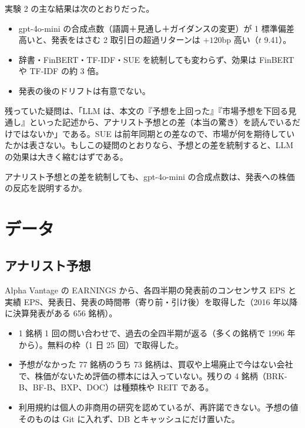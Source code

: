 \documentclass[xelatex,ja=standard,jafont=haranoaji,a4paper,10pt,openany]{bxjsreport}
\begin{document}
実験 2 の主な結果は次のとおりだった。

\begin{itemize}
\item gpt-4o-mini の合成点数（語調＋見通し＋ガイダンスの変更）が 1 標準偏差高いと、発表をはさむ 2 取引日の超過リターンは $+120$bp 高い（$t$ 9.41）。
\item 辞書・FinBERT・TF-IDF・SUE を統制しても変わらず、効果は FinBERT や TF-IDF の約 3 倍。
\item 発表の後のドリフトは有意でない。
\end{itemize}

残っていた疑問は、「LLM は、本文の『予想を上回った』『市場予想を下回る見通し』といった記述から、アナリスト予想との差（本当の驚き）を読んでいるだけではないか」である。SUE は前年同期との差なので、市場が何を期待していたかは表さない。もしこの疑問のとおりなら、予想との差を統制すると、LLM の効果は大きく縮むはずである。

\begin{verdict}[問い]
アナリスト予想との差を統制しても、gpt-4o-mini の合成点数は、発表への株価の反応を説明するか。
\end{verdict}

\chapter{データ}\label{ch:data}

\section{アナリスト予想}

Alpha Vantage の EARNINGS から、各四半期の発表前のコンセンサス EPS と実績 EPS、発表日、発表の時間帯（寄り前・引け後）を取得した（2016 年以降に決算発表がある 656 銘柄）。

\begin{itemize}
\item 1 銘柄 1 回の問い合わせで、過去の全四半期が返る（多くの銘柄で 1996 年から）。無料の枠（1 日 25 回）で取得した。
\item 予想がなかった 77 銘柄のうち 73 銘柄は、買収や上場廃止で今はない会社で、株価がないため評価の標本には入っていない。残りの 4 銘柄（BRK-B、BF-B、BXP、DOC）は種類株や REIT である。
\item 利用規約は個人の非商用の研究を認めているが、再許諾できない。予想の値そのものは Git に入れず、DB とキャッシュにだけ置いた。
\end{itemize}
\end{document}
